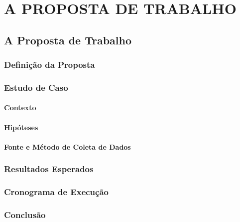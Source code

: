 \part{A PROPOSTA DE TRABALHO}

\chapter[A Proposta de Trabalho]{A Proposta de Trabalho}

\section[Definição da Proposta]{Definição da Proposta}

\section[Estudo de Caso]{Estudo de Caso}

\subsection[Contexto]{Contexto}

\subsection[Hipóteses]{Hipóteses}

\subsection[Fonte e Método Coleta de Dados]{Fonte e Método de Coleta de Dados}

\section[Resultados Esperados]{Resultados Esperados}

\section[Cronograma de Execução]{Cronograma de Execução}

\section[Conclusão]{Conclusão}